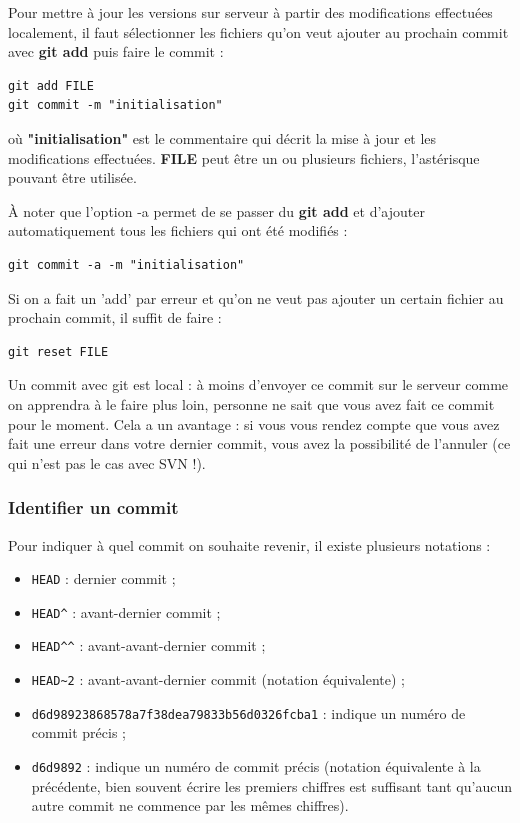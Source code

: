 \documentclass[a4paper,twoside]{article}
\begin{document}
Pour mettre à jour les versions sur serveur à partir des modifications effectuées localement, il faut sélectionner les fichiers qu'on veut ajouter au prochain commit avec \textbf{git add} puis faire le commit :
\begin{verbatim}
git add FILE
git commit -m "initialisation"
\end{verbatim}
où \textbf{"initialisation"} est le commentaire qui décrit la mise à jour et les modifications effectuées. \textbf{FILE} peut être un ou plusieurs fichiers, l'astérisque pouvant être utilisée.

À noter que l'option -a permet de se passer du \textbf{git add} et d'ajouter automatiquement tous les fichiers qui ont été modifiés :
 \begin{verbatim}
git commit -a -m "initialisation"
\end{verbatim}

\begin{remarque}
Si on a fait un 'add' par erreur et qu'on ne veut pas ajouter un certain fichier au prochain commit, il suffit de faire :
\begin{verbatim}
git reset FILE
\end{verbatim}
\end{remarque}

\bigskip

\begin{attention}
Un commit avec git est local : à moins d'envoyer ce commit sur le serveur comme on apprendra à le faire plus loin, personne ne sait que vous avez fait ce commit pour le moment. Cela a un avantage : si vous vous rendez compte que vous avez fait une erreur dans votre dernier commit, vous avez la possibilité de l'annuler (ce qui n'est pas le cas avec SVN !).
\end{attention}

\subsubsection{Identifier un commit}
Pour indiquer à quel commit on souhaite revenir, il existe plusieurs notations :
\begin{itemize}
\item \verb|HEAD| : dernier commit ;
\item \verb|HEAD^| : avant-dernier commit ;
\item \verb|HEAD^^| : avant-avant-dernier commit ;
\item \verb|HEAD~2| : avant-avant-dernier commit (notation équivalente) ;
\item \verb|d6d98923868578a7f38dea79833b56d0326fcba1| : indique un numéro de commit précis ;
\item \verb|d6d9892| : indique un numéro de commit précis (notation équivalente à la précédente, bien souvent écrire les premiers chiffres est suffisant tant qu'aucun autre commit ne commence par les mêmes chiffres).
\end{itemize}
\end{document}
